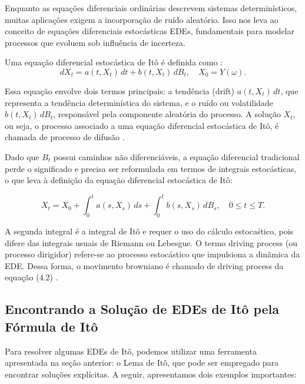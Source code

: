\documentclass[12pt,openright,oneside,a4paper]{abntex2}
\numberwithin{equation}{section}
\begin{document}
Enquanto as equações diferenciais ordinárias descrevem sistemas determinísticos, muitas aplicações exigem a incorporação de ruído aleatório. Isso nos leva ao conceito de equações diferenciais estocásticas EDEs, fundamentais para modelar processos que evoluem sob influência de incerteza.

Uma equação diferencial estocástica de Itô é definida como \parencite [p.~135] {Mikosh}:
\begin{equation}
dX_t = a(t, X_t)\,dt + b(t, X_t)\,dB_t, \quad X_0 = Y(\omega).
\end{equation}


Essa equação envolve dois termos principais: a tendência (drift) \(a(t, X_t)\,dt\), que representa a tendência 
determinística do sistema, e o ruído ou volatilidade \(b(t, X_t)\,dB_t\), responsável pela 
componente aleatória do processo. A solução \(X_t\), ou seja, o processo associado a uma equação diferencial 
estocástica de Itô, é chamada de processo de difusão \parencite [p.~137] {Mikosh}.

Dado que $B_t$ possui caminhos não diferenciáveis, a equação diferencial tradicional perde o significado e precisa ser reformulada em termos de integrais estocásticas, o que leva à definição da equação diferencial estocástica de Itô:

\begin{equation}
X_t = X_0 + \int_0^t a(s, X_s)\,ds + \int_0^t b(s, X_s)\,dB_s,  \quad 0 \leq t \leq T.
\end{equation}

A segunda integral é a integral de Itô e requer o uso do cálculo estocaśtico, pois difere das integrais usuais de Riemann ou Lebesgue.  
O termo driving process (ou processo dirigidor) refere-se ao processo estocástico que 
impulsiona a dinâmica da EDE. Dessa forma, o movimento browniano é chamado de driving process da equação (4.2) \parencite [p.~136] {Mikosh}.


\subsection{Encontrando a Solução de EDEs de Itô pela Fórmula de Itô}

Para resolver algumas EDEs de Itô, podemos utilizar uma ferramenta apresentada na seção anterior: o Lema de Itô, que pode ser empregado para encontrar soluções explícitas. A seguir, apresentamos dois exemplos importantes:
\end{document}

